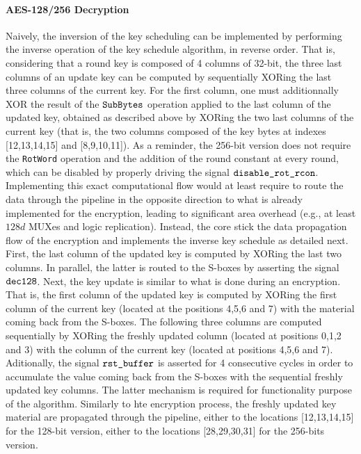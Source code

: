 \documentclass{scrartcl}
\begin{document}
\paragraph{AES-128/256 Decryption} Naively, the inversion of the key scheduling can be implemented by performing
the inverse operation of the key schedule algorithm, in reverse order. That is,
considering that a round key is composed of 4 columns of 32-bit, the three last
columns of an update key can be computed by sequentially XORing the last three
columns of the current key.  For the first column, one must additionnally XOR
the result of the $\texttt{SubBytes}$ operation applied to the last column of the updated
key, obtained as described above by XORing the two last columns of the current
key (that is, the two columns composed of the key bytes at indexes
[12,13,14,15] and [8,9,10,11]). As a reminder, the 256-bit version does not
require the \texttt{RotWord} operation and the addition of the round constant
at every round, which can be disabled by properly driving the signal
$\texttt{disable\_rot\_rcon}$. Implementing this exact computational flow would at
least require to route the data through the pipeline in the opposite direction
to what is already implemented for the encryption, leading to significant area
overhead (e.g., at least $128d$ MUXes and logic replication). Instead, the core
stick the data propagation flow of the encryption and implements the inverse
key schedule as detailed next. First, the last column of the updated key is
computed by XORing the last two columns. In parallel, the latter is routed to
the S-boxes by asserting the signal $\texttt{dec128}$.  Next, the key
update is similar to what is done during an encryption. That is, the first
column of the updated key is computed by XORing the first column of the current
key (located at the positions 4,5,6 and 7) with the material coming back from
the S-boxes. The following three columns are computed sequentially by XORing the
freshly updated column (located at positions 0,1,2 and 3) with the column of
the current key (located at positions 4,5,6 and 7). Aditionally, the signal
$\texttt{rst\_buffer}$ is asserted for 4 consecutive cycles in order to
accumulate the value coming back from the S-boxes with the sequential freshly
updated key columns.  The latter mechanism is required for functionality
purpose of the algorithm. Similarly to hte encryption process, the freshly
updated key material are propagated through the pipeline, either to the
locations [12,13,14,15] for the 128-bit version, either to the locations
[28,29,30,31] for the 256-bits version. 
\end{document}

